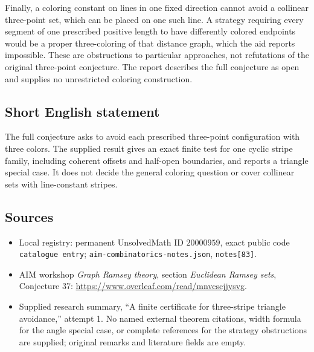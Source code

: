 \documentclass[11pt]{article}
\begin{document}
Finally, a coloring constant on lines in one fixed direction cannot avoid a collinear three-point set, which can be placed on one such line. A strategy requiring every segment of one prescribed positive length to have differently colored endpoints would be a proper three-coloring of that distance graph, which the aid reports impossible. These are obstructions to particular approaches, not refutations of the original three-point conjecture. The report describes the full conjecture as open and supplies no unrestricted coloring construction.
\subsection{Short English statement}
The full conjecture asks to avoid each prescribed three-point configuration with three colors. The supplied result gives an exact finite test for one cyclic stripe family, including coherent offsets and half-open boundaries, and reports a triangle special case. It does not decide the general coloring question or cover collinear sets with line-constant stripes.
\subsection{Sources}
\begin{itemize}
\item Local registry: permanent UnsolvedMath ID \(20000959\), exact public code \texttt{catalogue entry}; \texttt{aim-combinatorics-notes.json}, \texttt{notes[83]}.
\item AIM workshop \emph{Graph Ramsey theory}, section \emph{Euclidean Ramsey sets}, Conjecture 37: \url{https://www.overleaf.com/read/mnvcscjjysvg}.
\item Supplied research summary, ``A finite certificate for three-stripe triangle avoidance,'' attempt 1. No named external theorem citations, width formula for the angle special case, or complete references for the strategy obstructions are supplied; original remarks and literature fields are empty.
\end{itemize}
\end{document}
